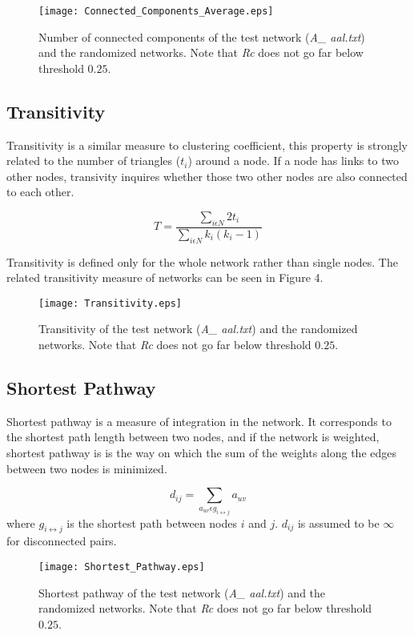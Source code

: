 \documentclass[12pt]{article}
\begin{document}
\begin{figure}[h!]
	
	\centering
	\texttt{[image: Connected\_Components\_Average.eps]}
	\caption{Number of connected components of the test network (\textit{A\_ aal.txt}) and the randomized networks. Note that \textit{Rc} does not go far below threshold $0.25$.}
\end{figure}

\newpage

\subsection{Transitivity}
	Transitivity is a similar measure to clustering coefficient, this property is strongly related to the number of triangles ($t_i$) around a node. If a node has links to two other nodes, transivity inquires whether those two other nodes are also connected to each other.
	
\begin{equation}
 T = \frac{\sum\limits_{i \epsilon N} 2 t_i}{\sum\limits_{i \epsilon N}k_i (k_i - 1)}
\end{equation}	

Transitivity is defined only for the whole network rather than single nodes. The related transitivity measure of networks can be seen in Figure 4. 

\begin{figure}[h!]
	
	\centering
	\texttt{[image: Transitivity.eps]}
	\caption{Transitivity of the test network (\textit{A\_ aal.txt}) and the randomized networks. Note that \textit{Rc} does not go far below threshold $0.25$.}
\end{figure}

\newpage

\subsection{Shortest Pathway}
Shortest pathway is a measure of integration in the network. It corresponds to the shortest path length between two nodes, and if the network is weighted, shortest pathway is is the way on which the sum of the weights along the edges between two nodes is minimized.  

\begin{equation}
d_{ij} = \sum\limits_{a_{uv} \epsilon g_{i\leftrightarrow j} } a_{uv}
\end{equation}
where $g_{i\leftrightarrow j}$ is the shortest path between nodes $i$ and $j$. $d_{ij}$ is assumed to be $\infty$ for disconnected pairs.


\begin{figure}[h!]
	
	\centering
	\texttt{[image: Shortest\_Pathway.eps]}
	\caption{Shortest pathway of the test network (\textit{A\_ aal.txt}) and the randomized networks. Note that \textit{Rc} does not go far below threshold $0.25$.}
\end{figure}
\end{document}
